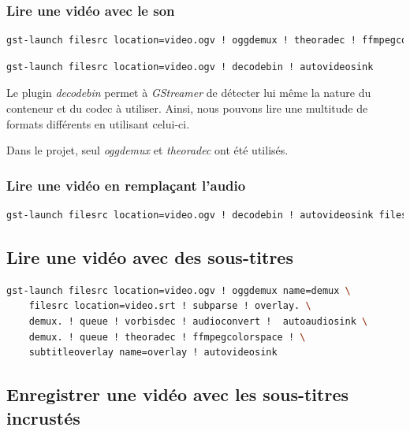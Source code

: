\documentclass[a4paper, 11pt]{article}
\begin{document}
	\subsubsection{Lire une vidéo avec le son}
	\begin{lstlisting}[numbers=none,language=sh, caption=Lire une vidéo -- Uniquement pour les fichier \texttt{.ogv}]
gst-launch filesrc location=video.ogv ! oggdemux ! theoradec ! ffmpegcolorspace ! autovideosink
	\end{lstlisting}
	\begin{lstlisting}[numbers=none,language=sh, caption=Lire une vidéo -- Pour tous les formats audio-vidéos]
gst-launch filesrc location=video.ogv ! decodebin ! autovideosink
	\end{lstlisting}
	\begin{remarque}
		Le plugin \textit{decodebin} permet à \textit{GStreamer} de détecter lui même la nature du conteneur et du codec à utiliser. Ainsi, nous pouvons lire une multitude de
		formats différents en utilisant celui-ci.

		Dans le projet, seul \textit{oggdemux} et \textit{theoradec} ont été utilisés.
	\end{remarque}
	\subsubsection{Lire une vidéo en remplaçant l'audio}
	\begin{lstlisting}[language=sh, caption=Lire une vidéo avec le son de source différente]
gst-launch filesrc location=video.ogv ! decodebin ! autovideosink filesrc location=music.oga ! decodebin ! autoaudiosink
	\end{lstlisting}
	\subsection{Lire une vidéo avec des sous-titres}
	\begin{lstlisting}[language=Bash, caption=Lire une vidéo avec des sous-titres \texttt{.srt}]	
gst-launch filesrc location=video.ogv ! oggdemux name=demux \ 
	filesrc location=video.srt ! subparse ! overlay. \
	demux. ! queue ! vorbisdec ! audioconvert !  autoaudiosink \
	demux. ! queue ! theoradec ! ffmpegcolorspace ! \
	subtitleoverlay name=overlay ! autovideosink
\end{lstlisting}
	\subsection{Enregistrer une vidéo avec les sous-titres incrustés}
\end{document}
